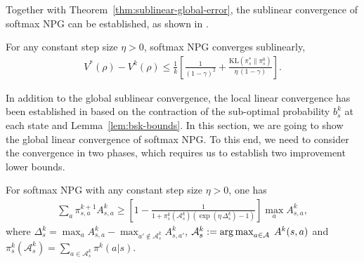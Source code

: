 Together with Theorem~\ref{thm:sublinear-global-error}, the sublinear convergence of softmax NPG can be established, as shown in \cite{Agarwal_Kakade_Lee_Mahajan_2019}.
\begin{theorem}\label{thm:softmaxNPG-sublinear}
    For any constant step size $\eta>0$, softmax NPG converges sublinearly,
    \begin{align*}
        V^*(\rho)-V^k(\rho) \leq \frac{1}{k}\left[\frac{1}{(1-\gamma)^2}+\frac{\mathrm{KL}(\pi_s^*\|\pi_s^{0})}{\eta\,(1-\gamma)}\right].
    \end{align*}
\end{theorem}
In addition to the global sublinear convergence, the local linear convergence has been established in \cite{Khodadadian_Jhunjhunwala_Varma_Maguluri_2021} based on the contraction of the sub-optimal probability $b_s^k$ at each state and Lemma~\ref{lem:bsk-bounds}. In this section, we are going to show the global linear convergence of softmax NPG. To this end, we need to consider the convergence in two phases, which requires us to establish two improvement lower bounds.
\begin{lemma}\label{lem:softmaxNPG-improvement-lower01}
For softmax NPG with any constant step size $\eta>0$, one has 
\begin{align*}
\sum_a \pi^{k+1}_{s,a}A^k_{s,a} \geq \left[1-\frac{1}{1+\pi_s^k(\mathcal{A}_s^k)\left(\exp\left(\eta\,\Delta_s^k\right)-1\right)}\right]\max_a A^k_{s,a},
\end{align*}
where $ \Delta_s^k=\max_a A^k_{s,a}-\max_{a'\not\in\mathcal{A}_s^k}A^k_{s,a'}$, ${\cal A}^k_s := \operatorname*{arg\,max}_{a\in{\cal A}} \; A^k(s,a)$ and $\pi^k_s(\mathcal{A}^k_s)=\sum_{a\in\mathcal{A}_s^k}\pi^k(a|s)$.
\end{lemma}
